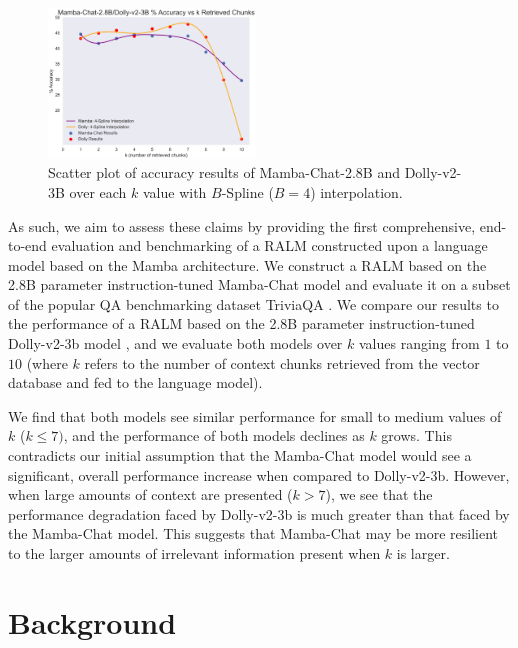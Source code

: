 \documentclass[11pt]{article}
\begin{document}
\begin{figure}[t]
    \centering
    \includegraphics[width=0.49\textwidth]{overleaf/figs/rag-results-over-k.png}
    \caption{Scatter plot of accuracy results of Mamba-Chat-2.8B and Dolly-v2-3B over each $k$ value with $B$-Spline ($B=4$) interpolation.}
    \label{fig:mamba-chat-results}
\end{figure}

As such, we aim to assess these claims by providing the first comprehensive, end-to-end evaluation and benchmarking of a RALM constructed upon a language model based on the Mamba architecture. We construct a RALM based on the 2.8B parameter instruction-tuned Mamba-Chat model \cite{haven2023mambachat} and evaluate it on a subset of the popular QA benchmarking dataset TriviaQA \cite{Joshi2017TriviaQAAL}. We compare our results to the performance of a RALM based on the 2.8B parameter instruction-tuned Dolly-v2-3b model \cite{DatabricksBlog2023DollyV2}, and we evaluate both models over $k$ values ranging from $1$ to $10$ (where $k$ refers to the number of context chunks retrieved from the vector database and fed to the language model).

We find that both models see similar performance for small to medium values of $k$ ($k \leq 7)$, and the performance of both models declines as $k$ grows. This contradicts our initial assumption that the Mamba-Chat model would see a significant, overall performance increase when compared to Dolly-v2-3b. However, when large amounts of context are presented ($k > 7$), we see that the performance degradation faced by Dolly-v2-3b is much greater than that faced by the Mamba-Chat model. This suggests that Mamba-Chat may be more resilient to the larger amounts of irrelevant information present when $k$ is larger.
 
\section{Background}
\end{document}
